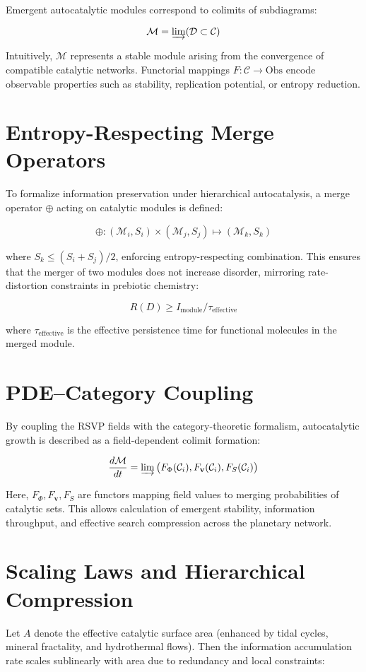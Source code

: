 \documentclass{book}
\begin{document}
Emergent autocatalytic modules correspond to colimits of subdiagrams:

\[\mathcal{M} = \varinjlim (\mathcal{D} \subset \mathcal{C})\]

Intuitively, $\mathcal{M}$ represents a stable module arising from the convergence of compatible catalytic networks. Functorial mappings $F: \mathcal{C} \to \mathrm{Obs}$ encode observable properties such as stability, replication potential, or entropy reduction.

\section{Entropy-Respecting Merge Operators}
To formalize information preservation under hierarchical autocatalysis, a merge operator $\oplus$ acting on catalytic modules is defined:

\[\oplus: (\mathcal{M}_i, S_i) \times (\mathcal{M}_j, S_j) \mapsto (\mathcal{M}_k, S_k)\]

where $S_k \le (S_i + S_j)/2$, enforcing entropy-respecting combination. This ensures that the merger of two modules does not increase disorder, mirroring rate-distortion constraints in prebiotic chemistry:

\[R(D) \ge I_{\text{module}} / \tau_{\mathrm{effective}}\]

where $\tau_{\mathrm{effective}}$ is the effective persistence time for functional molecules in the merged module.

\section{PDE–Category Coupling}
By coupling the RSVP fields with the category-theoretic formalism, autocatalytic growth is described as a field-dependent colimit formation:

\[\frac{d \mathcal{M}}{dt} = \varinjlim\big(F_\Phi(\mathcal{C}_i), F_\mathbf{v}(\mathcal{C}_i), F_S(\mathcal{C}_i)\big)\]

Here, $F_\Phi, F_\mathbf{v}, F_S$ are functors mapping field values to merging probabilities of catalytic sets. This allows calculation of emergent stability, information throughput, and effective search compression across the planetary network.

\section{Scaling Laws and Hierarchical Compression}
Let $A$ denote the effective catalytic surface area (enhanced by tidal cycles, mineral fractality, and hydrothermal flows). Then the information accumulation rate scales sublinearly with area due to redundancy and local constraints:
\end{document}
